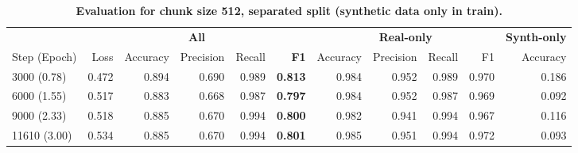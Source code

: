 \begin{table}[H]
\centering
\small
\caption[Evaluation for Chunk Size 512, Separated Split]{\textbf{Evaluation for chunk size 512, separated split (synthetic data only in train).}}
\label{tab:512_separated}
\begin{tabular}{@{}l *{10}{r} @{}}
\toprule
  & \multicolumn{5}{c}{\textbf{All}} 
  & \multicolumn{4}{c}{\textbf{Real-only}} 
  & \multicolumn{1}{c}{\textbf{Synth-only}} \\
\cmidrule(lr){2-6} \cmidrule(lr){7-10} \cmidrule(lr){11-11} 
Step (Epoch) & Loss & Accuracy & Precision & Recall & \textbf{F1}
& Accuracy & Precision & Recall & F1
& Accuracy \\
\midrule
3000 (0.78)  & 0.472 & 0.894 & 0.690 & 0.989 & \textbf{0.813} & 0.984 & 0.952 & 0.989 & 0.970 & 0.186 \\
6000 (1.55)  & 0.517 & 0.883 & 0.668 & 0.987 & \textbf{0.797} & 0.984 & 0.952 & 0.987 & 0.969 & 0.092 \\
9000 (2.33)  & 0.518 & 0.885 & 0.670 & 0.994 & \textbf{0.800} & 0.982 & 0.941 & 0.994 & 0.967 & 0.116 \\
11610 (3.00) & 0.534 & 0.885 & 0.670 & 0.994 & \textbf{0.801} & 0.985 & 0.951 & 0.994 & 0.972 & 0.093 \\
\bottomrule
\end{tabular}
\end{table}
